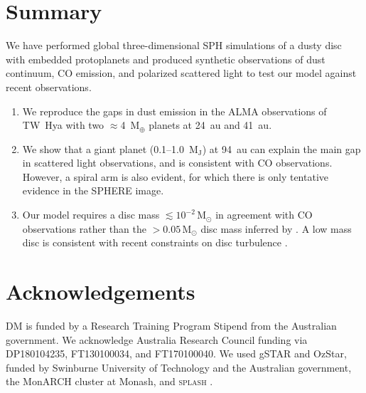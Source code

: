 \documentclass[usenatbib,a4paper,times]{mnras}
\renewcommand{\sun}{\mathrm{M}_{\odot}}
\renewcommand{\earth}{\mathrm{M}_{\oplus}}
\begin{document}
\section{Summary}
\label{sec:summary}

We have performed global three-dimensional SPH simulations of a dusty disc with
embedded protoplanets and produced synthetic observations of dust continuum, CO
emission, and polarized scattered light to test our model against recent
observations.

\begin{enumerate}
   \item We reproduce the gaps in dust emission in the ALMA observations of
      TW~Hya with two $\approx$4~$\earth{}$ planets at 24~au and 41~au.
   \item We show that a giant planet (0.1--1.0~$\mathrm{M_J}$) at 94~au can
      explain the main gap in scattered light observations, and is consistent
      with CO observations. However, a spiral arm is also evident, for which
      there is only tentative evidence in the SPHERE image.
   \item Our model requires a disc mass $\lesssim10^{-2}\,\sun{}$ in agreement
      with CO observations rather than the $>0.05\,\sun{}$ disc mass inferred by
      \citet{bergin:2013}. A low mass disc is consistent with recent constraints
      on disc turbulence \citep{flaherty:2018}.
\end{enumerate}










\section*{Acknowledgements}

DM is funded by a Research Training Program Stipend from the Australian
government. We acknowledge Australia Research Council funding via DP180104235,
FT130100034, and FT170100040. We used gSTAR and OzStar, funded by Swinburne
University of Technology and the Australian government, the MonARCH cluster at
Monash, and \textsc{splash} \citep{price:2007}.



\label{lastpage}
\end{document}
